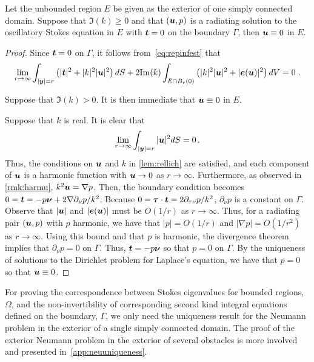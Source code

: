 \begin{thrm}
  Let the unbounded region $E$ be given as the exterior
  of one simply connected domain.
  Suppose that $\Im(k)\geq 0$ and 
  that $({\boldsymbol u},p)$ is a radiating solution to the oscillatory Stokes
  equation in $E$ with ${\boldsymbol t} = 0$ on the boundary $\Gamma$, then
  ${\boldsymbol u} \equiv 0$ in $E$.
\end{thrm}

\begin{proof}
Since ${\boldsymbol t} = 0$ on $\Gamma$, it follows
from~\cref{eq:repinfest} that
\begin{equation}
\lim_{r\to\infty}
\int_{|{\boldsymbol y}|=r} \left( |{\boldsymbol t}|^2 + |k|^2 |{\boldsymbol u}|^2 \right) dS +
2 {\textrm{\textup{Im}}}(k) \int_{E \cap B_{r}(0)} \left(|k|^2 |{\boldsymbol u}|^2 + |{\boldsymbol e}({\boldsymbol u})|^2 \right)
dV = 0 \; . \nonumber
\end{equation}

Suppose that $\Im(k) > 0$. It is then immediate
that ${\boldsymbol u} \equiv 0$ in $E$.

Suppose that $k$ is real. It is clear that
\begin{equation}
\lim_{r\to\infty} \int_{|{\boldsymbol y}|=r} |{\boldsymbol u}|^2 dS = 0 \, . \nonumber
\end{equation}
Thus, the conditions on ${\boldsymbol u}$ and $k$ in \cref{lem:rellich}
are satisfied, and each component of ${\boldsymbol u}$ is a harmonic function
with ${\boldsymbol u} \to 0$ as $r \to \infty$. Furthermore, as observed
in \cref{rmk:harmu}, $k^2 {\boldsymbol u} = \nabla p$. Then, the boundary
condition becomes $0 = {\boldsymbol t} = -p {\boldsymbol \nu} + 2 \nabla \partial_\nu p/k^2$.
Because $0 = {\boldsymbol \tau} \cdot {\boldsymbol t} = 2\partial_{\tau\nu} p/k^2$,
$\partial_\nu p $ is a constant on $\Gamma$.
Observe that $|{\boldsymbol u}|$ and $|{\boldsymbol e}({\boldsymbol u})|$ must be $O(1/r)$ as
$r\to\infty$. Thus,
for a radiating pair $({\boldsymbol u},p)$ with $p$ harmonic,
we have that $|p| = O(1/r)$ and $|\nabla p| = O(1/r^2)$
as $r\to\infty$.
Using this bound and that $p$ is harmonic,
the divergence theorem implies that $\partial_\nu p=0$ on $\Gamma$.
Thus, ${\boldsymbol t} = -p{\boldsymbol \nu}$ so that $p = 0$ on $\Gamma$. By the uniqueness
of solutions to the Dirichlet problem for Laplace's equation,
we have that $p=0$ so that ${\boldsymbol u} \equiv 0$.
\end{proof}

\begin{remark}
For proving the correspondence between Stokes eigenvalues
for bounded regions, $\Omega$, and the non-invertibility
of corresponding second kind integral equations defined on
the boundary, $\Gamma$, we only need the uniqueness result
for the Neumann problem in the exterior of a single
simply connected domain. The proof of the exterior
Neumann problem in the exterior of several
obstacles is more involved and presented
in~\cref{app:neuuniqueness}.
\end{remark}

